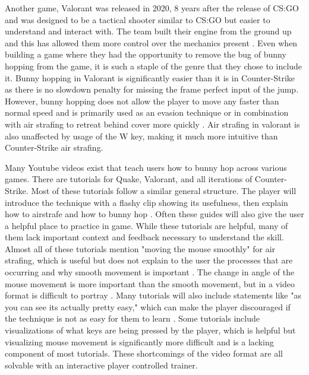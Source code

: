\documentclass[10pt,twocolumn]{article}
\begin{document}
Another game, Valorant was released in 2020, 8 years after the release of CS:GO and was designed to be a tactical shooter similar to CS:GO but easier to understand and interact with. The team built their engine from the ground up and this has allowed them more control over the mechanics present \cite{devDiaries}. Even when building a game where they had the opportunity to remove the bug of bunny hopping from the game, it is such a staple of the genre that they chose to include it. Bunny hopping in Valorant is significantly easier than it is in Counter-Strike as there is no slowdown penalty for missing the frame perfect input of the jump. However, bunny hopping does not allow the player to move any faster than normal speed and is primarily used as an evasion technique or in combination with air strafing to retreat behind cover more quickly \cite{BhopTutorialValorant}. Air strafing in valorant is also unaffected by usage of the W key, making it much more intuitive than Counter-Strike air strafing.

Many Youtube videos exist that teach users how to bunny hop across various games. There are tutorials for Quake, Valorant, and all iterations of Counter-Strike. Most of these tutorials follow a similar general structure. The player will introduce the technique with a flashy clip showing its usefulness, then explain how to airstrafe and how to bunny hop \cite{QuakeBHopTutorial}. Often these guides will also give the user a helpful place to practice in game. While these tutorials are helpful, many of them lack important context and feedback necessary to understand the skill. Almost all of these tutorials mention "moving the mouse smoothly" for air strafing, which is useful but does not explain to the user the processes that are occurring and why smooth movement is important \cite{HowToBhopCS2}. The change in angle of the mouse movement is more important than the smooth movement, but in a video format is difficult to portray \cite{BhopTutorialValorant}. Many tutorials will also include statements like "as you can see its actually pretty easy," which can make the player discouraged if the technique is not as easy for them to learn \cite{QuakeBHopTutorial}. Some tutorials include visualizations of what keys are being pressed by the player, which is helpful but visualizing mouse movement is significantly more difficult and is a lacking component of most tutorials. These shortcomings of the video format are all solvable with an interactive player controlled trainer.
\end{document}
